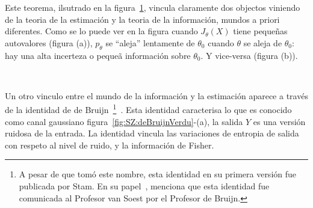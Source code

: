 %
Este teorema, ilsutrado en la figura~\ref{fig:SZ:JCurvatura}, vincula claramente
dos  objectos viniendo  de  la  teoria de  la  estimaci\'on y  la  teoria de  la
informaci\'on, mundos  a priori diferentes.  Como  se lo puede ver  en la figura
cuando $J_\theta(X)$  tiene peque\~nas  autovalores (figura (a)),  $p_\theta$ se
``aleja'' lentamente de  $\theta_0$ cuando $\theta$ se aleja  de $\theta_0$: hay
una  alta incerteza  o  peque\~a informaci\'on  sobre  $\theta_0$. Y  vice-versa
(figura (b)).
%
\begin{figure}[h!]
%
\begin{center}  \end{center}
%
%
\label{fig:SZ:JCurvatura}
\end{figure}

\

Un otro vinculo  entre el mundo de la informaci\'on y  la estimaci\'on aparece a
trav\'es  de la  identidad de  de Bruijn~\footnote{A  pesar de  que  tom\'o este
  nombre, esta identidad  en su primera versi\'on fue publicada  por Stam. En su
  papel~\cite{Sta59}, menciona que esta identidad fue comunicada al Profesor van
  Soest por el Profesor  de Bruijn.}~\cite{Sta59, CovTho06, Joh04, Bar84, Bar86,
  PalVer06}. Esta identidad caracterisa lo  que es conocido como canal gaussiano
figura~\ref{fig:SZ:deBruijnVerdu}-(a),  \ie  la  salida  $Y$  es  una  versi\'on
ruidosa  de la  entrada. La  identidad vincula  las variaciones  de  entropia de
salida con respeto al nivel de ruido, y la informaci\'on de Fisher.

